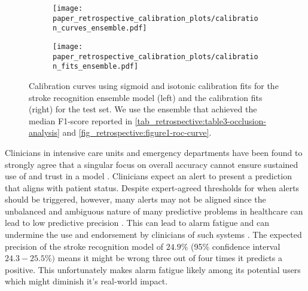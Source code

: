 \begin{figure}
    \begin{subfigure}[c]{0.48\columnwidth}
        \centering
        \texttt{[image: paper\_retrospective\_calibration\_plots/calibration\_curves\_ensemble.pdf]}
    \end{subfigure}    
    \begin{subfigure}[c]{0.48\columnwidth}
        \centering
        \texttt{[image: paper\_retrospective\_calibration\_plots/calibration\_fits\_ensemble.pdf]}
    \end{subfigure}    
    \caption[Calibration fits and curves for the stroke recognition model using Platt-scaling and isotonic regression for calibration.]{ Calibration curves using sigmoid and isotonic calibration fits for the stroke recognition ensemble model (left) and the calibration fits (right) for the test set. We use the ensemble that achieved the median F1-score reported in \cref{tab_retrospective:table3-occlusion-analysis} and \cref{fig_retrospective:figure1-roc-curve}.}
    \label{fig_discussion:retrospective-paper-calibration-curve-sigmoid-isotonic}
\end{figure}    

Clinicians in intensive care units and emergency departments have been found to strongly agree that a singular focus on overall accuracy cannot ensure sustained use of and trust in a model \cite{tonekaboni_what_2019}. Clinicians expect an alert to present a prediction that aligns with patient status. Despite expert-agreed thresholds for when alerts should be triggered, however, many alerts may not be aligned since the unbalanced and ambiguous nature of many predictive problems in healthcare can lead to low predictive precision \parencite{umscheid_development_2015, cite14, cite15, wenstrup_retrospective_2023}. This can lead to alarm fatigue \parencite{embi_evaluating_2012} and can undermine the use and endorsement by clinicians of such systems \parencite{guidi_clinician_2015}. 
The expected precision of the stroke recognition model of $24.9\%$ (95\% confidence interval $24.3-25.5\%)$ means it might be wrong three out of four times it predicts a positive. This unfortunately makes alarm fatigue likely among its potential users which might diminish it's real-world impact.


